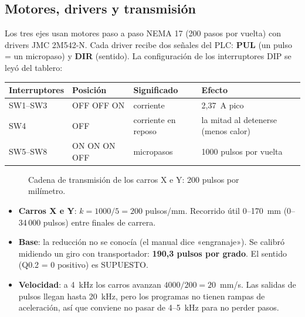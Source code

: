 \documentclass[a4paper,11pt]{article}
\begin{document}
\subsection{Motores, drivers y transmisión}
Los tres ejes usan motores paso a paso NEMA 17 (200 pasos por vuelta) con drivers JMC 2M542-N. Cada driver recibe dos señales del PLC: \textbf{PUL} (un pulso = un micropaso) y \textbf{DIR} (sentido). La configuración de los interruptores DIP se leyó del tablero:

\begin{center}\small
\begin{tabular}{@{}llll@{}}
\toprule
\textbf{Interruptores} & \textbf{Posición} & \textbf{Significado} & \textbf{Efecto}\\
\midrule
SW1--SW3 & OFF OFF ON & corriente & 2,37~A pico\\
SW4 & OFF & corriente en reposo & la mitad al detenerse (menos calor)\\
SW5--SW8 & ON ON ON OFF & micropasos & 1000 pulsos por vuelta\\
\bottomrule
\end{tabular}
\end{center}

\begin{figure}[H]
\centering
{}
\caption{Cadena de transmisión de los carros X e Y: 200 pulsos por milímetro.}
\end{figure}

\begin{itemize}
\item \textbf{Carros X e Y}: $k = 1000 / 5 = 200$ pulsos/mm. Recorrido útil 0--170~mm (0--34\,000 pulsos) entre finales de carrera.
\item \textbf{Base}: la reducción no se conocía (el manual dice «engranaje»). Se calibró midiendo un giro con transportador: \textbf{190,3 pulsos por grado}. El sentido (Q0.2 = 0 positivo) es SUPUESTO.
\item \textbf{Velocidad}: a 4~kHz los carros avanzan $4000 / 200 = 20$~mm/s. Las salidas de pulsos llegan hasta 20~kHz, pero los programas no tienen rampas de aceleración, así que conviene no pasar de 4--5~kHz para no perder pasos.
\end{itemize}
\end{document}
